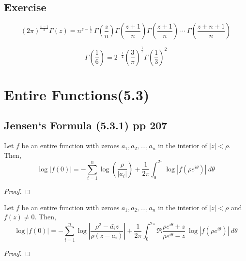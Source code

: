 \subsection*{Exercise}
\begin{remark}
	\begin{equation}
		(2\pi)^\frac{n-1}{2} \Gamma(z) = n^{z-\frac{1}{2}} \ \Gamma\left(\frac{z}{n}\right) \Gamma\left(\frac{z+1}{n}\right) \Gamma\left(\frac{z+1}{n}\right) \ \dotsm \ \Gamma\left(\frac{z+n+1}{n}\right)
	\end{equation}
\end{remark}

\begin{remark}
	\begin{equation}
		\Gamma\left(\frac{1}{6}\right) = 2^{-\frac{1}{2}} \left( \frac{3}{\pi}\right)^\frac{1}{2} \Gamma\left(\frac{1}{3}\right)^2
	\end{equation}
\end{remark}

\section{Entire Functions(5.3)}
\subsection{Jensen`s Formula (5.3.1) pp 207}
\begin{remark}
	Let $f$ be an entire function with zeroes $a_1,a_2,\dots,a_n$ in the interior of $|z| < \rho$.
	Then,
	\begin{equation}
		\log |f(0)| = -\sum_{i=1}^n \log \left( \frac{\rho}{|a_i|} \right) + \frac{1}{2\pi} \int_0^{2\pi} \log \left| f\left(\rho e^{i\theta}\right) \right| \ d\theta
	\end{equation}
\end{remark}
\begin{proof}
\end{proof}
\begin{remark}
	Let $f$ be an entire function with zeroes $a_1,a_2,\dots,a_n$ in the interior of $|z| < \rho$ and $f(z) \ne 0$.
	Then,
	\begin{equation}
		\log |f(0)| = -\sum_{i=1}^n \log \left| \frac{\rho^2-\bar{a_i}z}{\rho(z-a_i)} \right| + \frac{1}{2\pi} \int_0^{2\pi} \Re \frac{\rho e^{i \theta}+z}{\rho e^{i \theta} - z}\ \log \left| f\left(\rho e^{i\theta}\right) \right| \ d\theta
	\end{equation}
\end{remark}
\begin{proof}
\end{proof}

